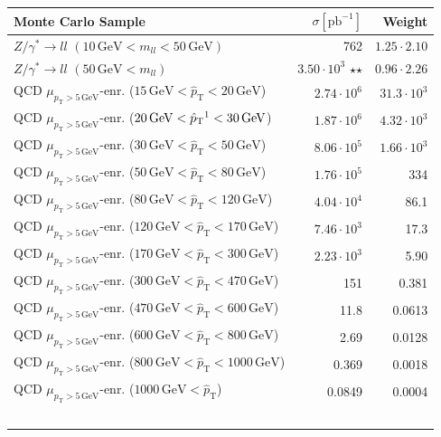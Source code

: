 \begin{table}[htbp!]
  \centering
  \begin{tabular}{|l|r|r|}
\hline
Monte Carlo Sample & $\sigma [\text{pb}^{-1}]$ & Weight \\
\hline
\hline
$Z/\gamma^* \rightarrow ll$ $(10\,\text{GeV} < m_{ll} < 50\,\text{GeV})$ & 762 & $1.25 \cdot 2.10$ \\
$Z/\gamma^* \rightarrow ll$ $(50\,\text{GeV} < m_{ll})$ & $3.50 \cdot 10^3$ $\star$$\star$ & $0.96 \cdot 2.26$ \\
\hline
QCD $\mu_{p_\text{T} > 5\,\text{GeV}}$-enr. ($15\,\text{GeV} < \hat{p}_{\text{T}} < 20\,\text{GeV}$) & $2.74 \cdot 10^6$ & $31.3 \cdot 10^3$ \\
QCD $\mu_{p_\text{T} > 5\,\text{GeV}}$-enr. ($20\,\text{GeV} < \hat{p}_{\text{T}}\footnotemark < 30\,\text{GeV}$) & $1.87 \cdot 10^6$ & $4.32 \cdot 10^3$ \\
QCD $\mu_{p_\text{T} > 5\,\text{GeV}}$-enr. ($30\,\text{GeV} < \hat{p}_{\text{T}} < 50\,\text{GeV}$) & $8.06 \cdot 10^5$ & $1.66 \cdot 10^3$ \\
QCD $\mu_{p_\text{T} > 5\,\text{GeV}}$-enr. ($50\,\text{GeV} < \hat{p}_{\text{T}} < 80\,\text{GeV}$) & $1.76 \cdot 10^5$ & 334 \\
QCD $\mu_{p_\text{T} > 5\,\text{GeV}}$-enr. ($80\,\text{GeV} < \hat{p}_{\text{T}} < 120\,\text{GeV}$) & $4.04 \cdot 10^4$ & 86.1 \\
QCD $\mu_{p_\text{T} > 5\,\text{GeV}}$-enr. ($120\,\text{GeV} < \hat{p}_{\text{T}} < 170\,\text{GeV}$) & $7.46 \cdot 10^3$ & 17.3 \\
QCD $\mu_{p_\text{T} > 5\,\text{GeV}}$-enr. ($170\,\text{GeV} < \hat{p}_{\text{T}} < 300\,\text{GeV}$) & $2.23 \cdot 10^3$ & 5.90 \\
QCD $\mu_{p_\text{T} > 5\,\text{GeV}}$-enr. ($300\,\text{GeV} < \hat{p}_{\text{T}} < 470\,\text{GeV}$) & 151 & 0.381 \\
QCD $\mu_{p_\text{T} > 5\,\text{GeV}}$-enr. ($470\,\text{GeV} < \hat{p}_{\text{T}} < 600\,\text{GeV}$) & 11.8 & 0.0613 \\
QCD $\mu_{p_\text{T} > 5\,\text{GeV}}$-enr. ($600\,\text{GeV} < \hat{p}_{\text{T}} < 800\,\text{GeV}$) & 2.69 & 0.0128 \\
QCD $\mu_{p_\text{T} > 5\,\text{GeV}}$-enr. ($800\,\text{GeV} < \hat{p}_{\text{T}} < 1000\,\text{GeV}$) & 0.369 & 0.0018 \\
QCD $\mu_{p_\text{T} > 5\,\text{GeV}}$-enr. ($1000\,\text{GeV} < \hat{p}_{\text{T}}$) & 0.0849 & 0.0004 \\
$$
\end{tabular}
\end{table}
